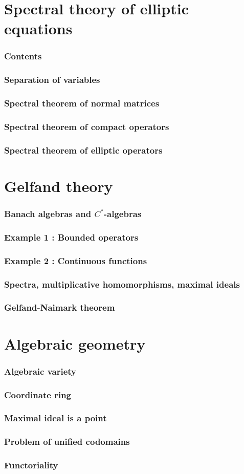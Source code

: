 \documentclass{beamer}
\begin{document}
\section{Spectral theory of elliptic equations}
\begin{frame}
\frametitle{Contents}
  \tableofcontents[currentsection]
\end{frame}

\begin{frame}
\frametitle{Separation of variables}
\end{frame}
\begin{frame}
\frametitle{Spectral theorem of normal matrices}
\end{frame}
\begin{frame}
\frametitle{Spectral theorem of compact operators}
\end{frame}
\begin{frame}
\frametitle{Spectral theorem of elliptic operators}
\end{frame}


\section{Gelfand theory}
\begin{frame}
\frametitle{Banach algebras and $C^*$-algebras}
\end{frame}
\begin{frame}
\frametitle{Example 1 : Bounded operators}
\end{frame}
\begin{frame}
\frametitle{Example 2 : Continuous functions}
\end{frame}
\begin{frame}
\frametitle{Spectra, multiplicative homomorphisms, maximal ideals}
\end{frame}
\begin{frame}
\frametitle{Gelfand-Naimark theorem}
\end{frame}


\section{Algebraic geometry}
\begin{frame}
\frametitle{Algebraic variety}
\end{frame}
\begin{frame}
\frametitle{Coordinate ring}
\end{frame}
\begin{frame}
\frametitle{Maximal ideal is a point}
\end{frame}
\begin{frame}
\frametitle{Problem of unified codomains}
\end{frame}
\begin{frame}
\frametitle{Functoriality}
\end{frame}
\end{document}
